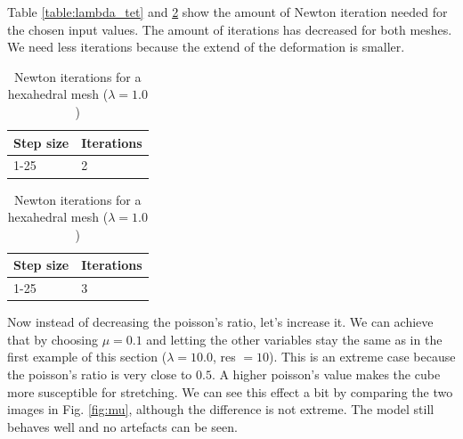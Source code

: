 Table \ref{table:lambda_tet} and \ref{table:lambda_hex} show the amount of Newton iteration needed for the chosen input values. The amount of iterations has decreased for both meshes. We need less iterations because the extend of the deformation is smaller.

\begin{table}[!htbp]
\parbox{.45\linewidth}{
\centering
\begin{tabular}{ | l | l |}
\hline
\textbf{Step size} & \textbf{Iterations} \\ \hline
1-25 & 2 \\ \hline
\end{tabular}
\caption{Newton iterations for a tetrahedral mesh ($\lambda = 1.0$)}
\label{table:lambda_tet}
}
\hfill
\parbox{.45\linewidth}{
\centering
\begin{tabular}{ | l | l |}
\hline
\textbf{Step size} & \textbf{Iterations} \\ \hline
1-25 & 3 \\ \hline
\end{tabular}
\caption{Newton iterations for a hexahedral mesh ($\lambda = 1.0$)}
\label{table:lambda_hex}
}
\end{table}

Now instead of decreasing the poisson's ratio, let's increase it. We can achieve that by choosing $\mu = 0.1$ and letting the other variables stay the same as in the first example of this section ($\lambda = 10.0$, res $= 10$). This is an extreme case because the poisson's ratio is very close to $0.5$. A higher poisson's value makes the cube more susceptible for stretching. We can see this effect a bit by comparing the two images in Fig. \ref{fig:mu}, although the difference is not extreme. The model still behaves well and no artefacts can be seen.

